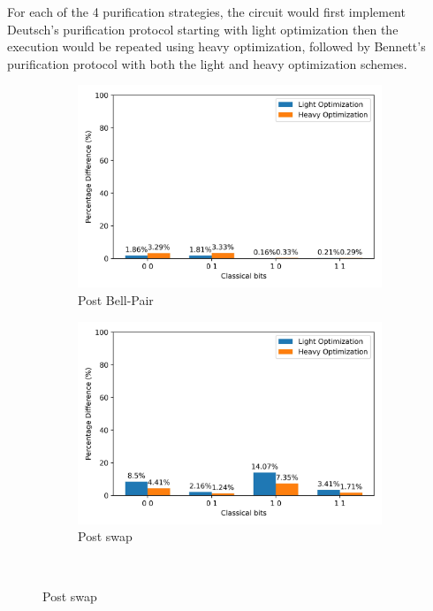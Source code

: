 \documentclass[11pt]{article}
\begin{document}
For each of the 4 purification strategies, the circuit would first implement Deutsch's purification protocol starting with light optimization then the execution would be repeated using heavy optimization, followed by Bennett's purification protocol with both the light and heavy optimization schemes.
\begin{figure}[ht]
  \centering
  \begin{subfigure}[b]{0.45\textwidth}
    \includegraphics[width=\linewidth]{figures/po_post_bell_pair.jpg}
    \caption{Post Bell-Pair}
    \label{fig:po_all_post_bell_pair}
  \end{subfigure}
  \begin{subfigure}[b]{0.45\textwidth}
    \includegraphics[width=\linewidth]{figures/po_post_swap.jpg}
    \caption{Post swap}
    \label{fig:po_all_post_swap}
  \end{subfigure}
  \\

\end{figure}
\end{document}
